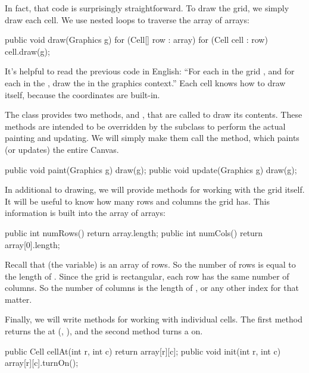 In fact, that code is surprisingly straightforward.
To draw the grid, we simply draw each cell.
We use nested  loops to traverse the array of arrays:

\begin{code}
public void draw(Graphics g) {
    for (Cell[] row : array) {
        for (Cell cell : row) {
            cell.draw(g);
        }
    }
}
\end{code}

It's helpful to read the previous code in English: ``For each  in the grid , and for each  in the , draw the  in the graphics context.''
Each cell knows how to draw itself, because the coordinates are built-in.

The  class provides two methods,  and , that are called to draw its contents.
These methods are intended to be overridden by the subclass to perform the actual painting and updating.
We will simply make them call the  method, which paints (or updates) the entire Canvas.


\begin{code}
public void paint(Graphics g) {
    draw(g);
}
public void update(Graphics g) {
    draw(g);
}
\end{code}

In additional to drawing, we will provide methods for working with the grid itself.
It will be useful to know how many rows and columns the grid has.
This information is built into the array of arrays:

\begin{code}
public int numRows() {
    return array.length;
}
public int numCols() {
    return array[0].length;
}
\end{code}

Recall that  (the variable) is an array of rows.
So the number of rows is equal to the length of .
Since the grid is rectangular, each row has the same number of columns.
So the number of columns is the length of , or any other index for that matter.

Finally, we will write methods for working with individual cells.
The first method returns the  at (, ), and the second method turns a  on.

\begin{code}
public Cell cellAt(int r, int c) {
    return array[r][c];
}
public void init(int r, int c) {
    array[r][c].turnOn();
}
\end{code}